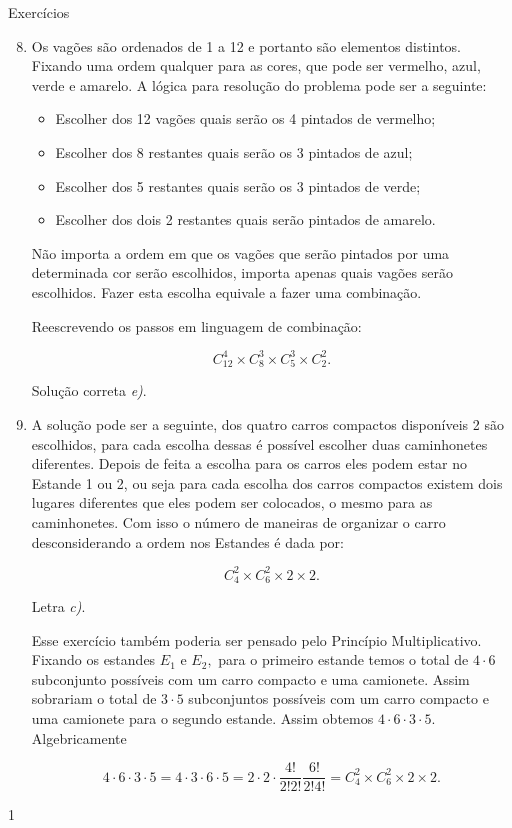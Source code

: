 \begin{answer}{Exercícios}
{\exerciselist
\begin{enumerate}\setcounter{enumi}{7}
\item 
Os vagões são ordenados de 1 a 12 e portanto são elementos distintos. Fixando uma ordem qualquer para as cores, que pode ser vermelho, azul, verde e amarelo. A lógica para resolução do problema pode ser a seguinte: 

\begin{itemize}
    \item  Escolher dos 12 vagões quais serão os 4 pintados de vermelho;
    \item Escolher dos 8 restantes quais serão os 3 pintados de azul;
    \item Escolher dos 5 restantes quais serão os 3 pintados de verde;
    \item Escolher dos dois 2 restantes quais serão pintados de amarelo.
\end{itemize}

 Não importa a ordem em que os vagões que serão pintados por uma determinada cor serão escolhidos, importa apenas quais vagões serão escolhidos. Fazer esta escolha equivale a fazer uma combinação.
 
 Reescrevendo os passos em linguagem de combinação:
 
$$C^4_{12} \times C^3_{8} \times C^3_{5} \times C^2_{2}.$$

Solução correta \textit{e)}.


\item A solução pode ser a seguinte, dos quatro carros compactos disponíveis 2 são escolhidos, para cada escolha dessas é possível escolher duas caminhonetes diferentes. Depois de feita a escolha para os carros eles podem estar no Estande 1 ou 2, ou seja para cada escolha dos carros compactos existem dois lugares diferentes que eles podem ser colocados, o mesmo para as caminhonetes. Com isso o número de maneiras de organizar o carro desconsiderando a ordem nos Estandes é dada por: 

$$C^2_{4} \times  C^2_{6} \times 2 \times 2.$$

Letra \textit{c)}.

Esse exercício também poderia ser pensado pelo Princípio Multiplicativo. Fixando os estandes $E_1$ e $E_{2},$ para o primeiro estande temos o total de $4\cdot6$ subconjunto possíveis com um carro compacto e uma camionete. Assim sobrariam o total de $3\cdot5$ subconjuntos possíveis com um carro compacto e uma camionete para o segundo estande. Assim obtemos $4\cdot6 \cdot 3 \cdot 5. $ Algebricamente 

$$4\cdot6 \cdot 3 \cdot 5 =4\cdot3 \cdot 6 \cdot 5 = 2 \cdot 2 \cdot \dfrac{4!}{2!2!}\dfrac{6!}{2!4!} = C^2_{4} \times  C^2_{6} \times 2 \times 2 .$$
\end{enumerate}
}{1}
\end{answer}


